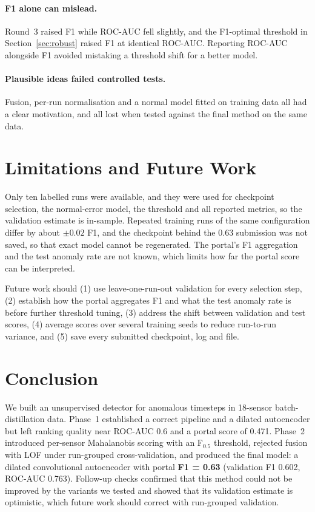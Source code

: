 \documentclass[runningheads]{llncs}
\begin{document}
\paragraph{F1 alone can mislead.} Round~3 raised F1 while ROC-AUC fell slightly, and the F1-optimal threshold in Section~\ref{sec:robust} raised F1 at identical ROC-AUC. Reporting ROC-AUC alongside F1 avoided mistaking a threshold shift for a better model.

\paragraph{Plausible ideas failed controlled tests.} Fusion, per-run normalisation and a normal model fitted on training data all had a clear motivation, and all lost when tested against the final method on the same data.

\section{Limitations and Future Work}

Only ten labelled runs were available, and they were used for checkpoint selection, the normal-error model, the threshold and all reported metrics, so the validation estimate is in-sample. Repeated training runs of the same configuration differ by about $\pm 0.02$ F1, and the checkpoint behind the 0.63 submission was not saved, so that exact model cannot be regenerated. The portal's F1 aggregation and the test anomaly rate are not known, which limits how far the portal score can be interpreted.

Future work should (1) use leave-one-run-out validation for every selection step, (2) establish how the portal aggregates F1 and what the test anomaly rate is before further threshold tuning, (3) address the shift between validation and test scores, (4) average scores over several training seeds to reduce run-to-run variance, and (5) save every submitted checkpoint, log and file.

\section{Conclusion}

We built an unsupervised detector for anomalous timesteps in 18-sensor batch-distillation data. Phase~1 established a correct pipeline and a dilated autoencoder but left ranking quality near ROC-AUC 0.6 and a portal score of 0.471. Phase~2 introduced per-sensor Mahalanobis scoring with an F$_{0.5}$ threshold, rejected fusion with LOF under run-grouped cross-validation, and produced the final model: a dilated convolutional autoencoder with portal \textbf{F1 = 0.63} (validation F1 0.602, ROC-AUC 0.763). Follow-up checks confirmed that this method could not be improved by the variants we tested and showed that its validation estimate is optimistic, which future work should correct with run-grouped validation.
\end{document}
